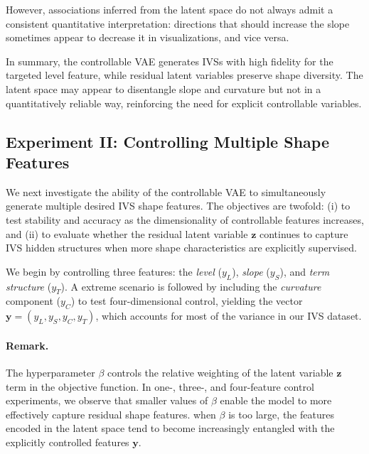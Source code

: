 \documentclass{article}
\begin{document}
However, associations inferred from the latent space do not always admit a consistent quantitative interpretation: directions that should increase the slope sometimes appear to decrease it in visualizations, and vice versa.


In summary, the controllable VAE generates IVSs with high fidelity for the targeted level feature, while residual latent variables preserve shape diversity.   The latent space may appear to disentangle slope and curvature but not in a quantitatively reliable way, reinforcing the need for explicit controllable variables.



\subsection{Experiment II: Controlling Multiple Shape Features}
\label{sec:exp2}

 We next investigate the ability of the controllable VAE  to simultaneously generate multiple desired IVS shape features. The objectives are twofold: (i) to test stability and accuracy as the dimensionality of controllable features increases, and (ii) to evaluate whether the residual latent variable $\mathbf{z}$ continues to capture IVS hidden structures when more shape characteristics are explicitly supervised.  



We begin by controlling three features: the \textit{level} ($y_L$), \textit{slope} ($y_S$), and \textit{term structure} ($y_T$).  A  extreme scenario is followed by  including the \textit{curvature} component ($y_C$) to test four-dimensional control, yielding the  vector $\mathbf{y} = (y_L, y_S, y_C, y_T)$, which accounts for most of the  variance in our IVS dataset. 

\paragraph{Remark.} \label{para:beta}
The hyperparameter $\beta$ controls the relative weighting of the latent variable $\mathbf{z}$ term in the objective function. In one-, three-, and four-feature control experiments, we observe that smaller values of $\beta$ enable the model to more effectively capture residual shape features. when $\beta$ is too large, the features encoded in the latent space tend to become increasingly entangled with the explicitly controlled features $\mathbf{y}$. 
\end{document}
